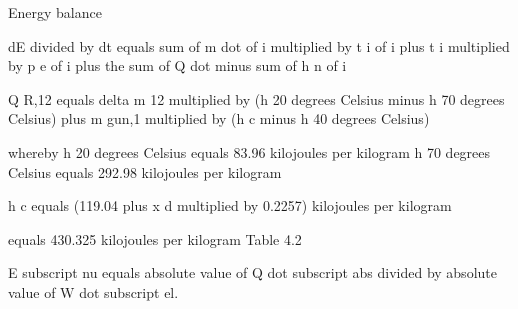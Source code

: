 Energy balance

dE divided by dt equals sum of m dot of i multiplied by t i of i plus t i multiplied by p e of i plus the sum of Q dot minus sum of h n of i

Q R,12 equals delta m 12 multiplied by (h 20 degrees Celsius minus h 70 degrees Celsius) plus m gun,1 multiplied by (h c minus h 40 degrees Celsius)

whereby h 20 degrees Celsius equals 83.96 kilojoules per kilogram  
h 70 degrees Celsius equals 292.98 kilojoules per kilogram

h c equals (119.04 plus x d multiplied by 0.2257) kilojoules per kilogram

equals 430.325 kilojoules per kilogram  
Table 4.2

E subscript nu equals absolute value of Q dot subscript abs divided by absolute value of W dot subscript el.